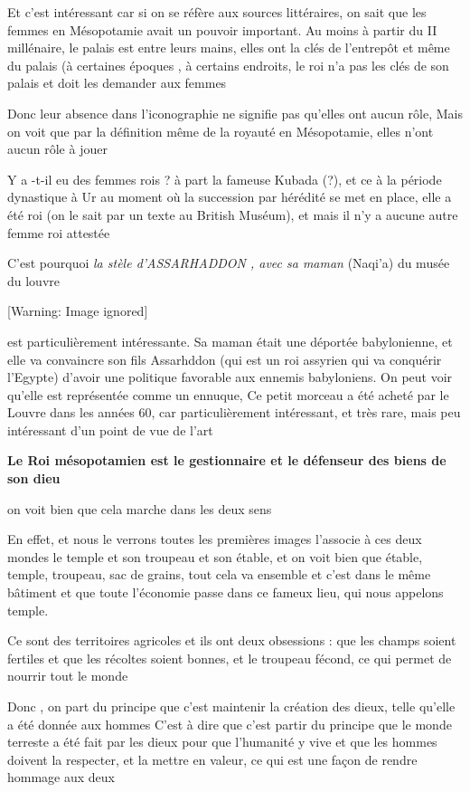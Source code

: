 \documentclass[a4paper,10pt]{article}
\begin{document}
Et c'est intéressant car si on se réfère aux sources
littéraires, on sait que les femmes en Mésopotamie avait un pouvoir
important. Au moins à partir du II millénaire, le palais est entre
leurs mains, elles ont la clés de l'entrepôt et même
du palais (à certaines époques , à certains endroits, le roi
n'a pas les clés de son palais et doit les demander
aux femmes

Donc leur absence dans l'iconographie ne signifie pas
qu'elles ont aucun rôle,  Mais on voit que par la
définition même de la royauté en Mésopotamie, elles
n'ont aucun rôle à jouer

Y a -t-il eu des femmes rois ?  à part la fameuse Kubada (?),  et ce à
la période dynastique à Ur au moment où la succession par hérédité se
met en place, elle a été roi (on le sait par un texte au British
Muséum), et mais il n'y a aucune autre femme roi
attestée

C'est pourquoi \textit{la stèle
d'ASSARHADDON ,  avec sa maman}
(Naqi'a) du musée du louvre 

  [Warning: Image ignored] %
 

est particulièrement intéressante. Sa maman était une déportée
babylonienne, et elle va convaincre son fils Assarhddon (qui est un roi
assyrien qui va conquérir l'Egypte)
d'avoir une politique favorable aux ennemis
babyloniens. On peut voir qu'elle est représentée
comme un ennuque,  Ce petit morceau a été acheté par le Louvre dans les
années 60, car particulièrement intéressant, et très rare, mais peu
intéressant d'un point de vue de
l'art

\textbf{Le Roi mésopotamien est le gestionnaire et le défenseur des
biens de son dieu}

on voit bien que cela marche dans les deux sens

En effet, et nous le verrons toutes les  premières  images
l'associe à ces deux mondes le temple et son troupeau
et son étable,  et on voit bien que étable, temple, troupeau, sac de
grains, tout cela va ensemble et c'est dans le même
bâtiment  et que toute l'économie passe dans ce fameux
lieu, qui nous appelons temple.

Ce sont des territoires agricoles et ils ont deux obsessions  : que les
champs soient fertiles et que les récoltes soient bonnes, et le
troupeau fécond, ce qui permet de nourrir tout le monde

Donc , on part du principe que c'est maintenir la
création des dieux, telle qu'elle a été donnée aux
hommes C'est à dire que c'est partir
du principe que le monde terreste a été fait par les dieux pour que
l'humanité y vive et que les hommes doivent la
respecter, et la mettre en valeur, ce qui est une façon de rendre
hommage aux deux
\end{document}
